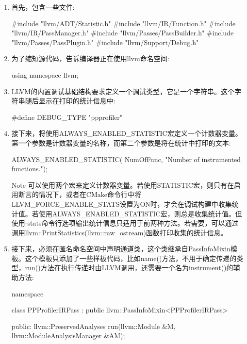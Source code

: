 \begin{enumerate}
\item
首先，包含一些文件:

\begin{cpp}
#include "llvm/ADT/Statistic.h"
#include "llvm/IR/Function.h"
#include "llvm/IR/PassManager.h"
#include "llvm/Passes/PassBuilder.h"
#include "llvm/Passes/PassPlugin.h"
#include "llvm/Support/Debug.h"
\end{cpp}

\item
为了缩短源代码，告诉编译器正在使用llvm命名空间:

\begin{cpp}
using namespace llvm;
\end{cpp}

\item
LLVM的内置调试基础结构要求定义一个调试类型，它是一个字符串。这个字符串随后显示在打印的统计信息中:

\begin{cpp}
#define DEBUG_TYPE "ppprofiler"
\end{cpp}

\item
接下来，将使用ALWAYS\_ENABLED\_STATISTIC宏定义一个计数器变量。第一个参数是计数器变量的名称，而第二个参数是将在统计中打印的文本:

\begin{cpp}
ALWAYS_ENABLED_STATISTIC(
    NumOfFunc, "Number of instrumented functions.");
\end{cpp}

\begin{myNotic}{Note}
可以使用两个宏来定义计数器变量。若使用STATISTIC宏，则只有在启用断言的情况下，或者在CMake命令行中将LLVM\_FORCE\_ENABLE\_STATS设置为ON时，才会在调试构建中收集统计值。若使用ALWAYS\_ENABLED\_STATISTIC宏，则总是收集统计值。但使用-stats命令行选项输出统计信息只适用于前两种方法。若需要，可以通过调用llvm::PrintStatistics(llvm::raw\_ostream)函数打印收集的统计信息。
\end{myNotic}

\item
接下来，必须在匿名命名空间中声明通道类，这个类继承自PassInfoMixin模板。这个模板只添加了一些样板代码，比如name()方法，不用于确定传递的类型，run()方法在执行传递时由LLVM调用，还需要一个名为instrument()的辅助方法:

\begin{cpp}
namespace {
class PPProfilerIRPass
: public llvm::PassInfoMixin<PPProfilerIRPass> {
public:
    llvm::PreservedAnalyses
    run(llvm::Module &M, llvm::ModuleAnalysisManager &AM);

}}
\end{cpp}
\end{enumerate}
